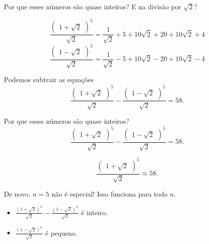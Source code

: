 \documentclass[aspectratio=169, handout]{beamer}
\begin{document}
\begin{frame}{Por que esses números são quase inteiros?}
	E na divisão por $\sqrt{2}$?

	\pause
	\[
		\frac{\begin{pmatrix}1+\sqrt{2}\end{pmatrix}^5}{\sqrt{2}} = \frac{1}{\sqrt{2}} + 5 + 10\sqrt{2} + 20 + 10\sqrt{2} + 4
	\]
	\[
		\frac{\begin{pmatrix}1-\sqrt{2}\end{pmatrix}^5}{\sqrt{2}} = \frac{1}{\sqrt{2}} - 5 + 10\sqrt{2} - 20 + 10\sqrt{2} - 4
	\]

	\pause Podemos subtrair as equações \[
		\frac{\begin{pmatrix} 1+\sqrt{2} \end{pmatrix}^5}{\sqrt{2}} - \frac{\begin{pmatrix} 1 - \sqrt{2} \end{pmatrix}^5}{\sqrt{2}} = 58.
	\]
\end{frame}

\begin{frame}{Por que esses números são quase inteiros?}
	\[
		\frac{\begin{pmatrix} 1+\sqrt{2} \end{pmatrix}^5}{\sqrt{2}} - \frac{\begin{pmatrix} 1 - \sqrt{2} \end{pmatrix}^5}{\sqrt{2}} = 58.
	\]

	\pause \[
		\frac{\begin{pmatrix} 1+\sqrt{2} \end{pmatrix}^5}{\sqrt{2}} \approx 58.
	\]


	\pause De novo, $n = 5$ não é especial! Isso funciona para todo $n$.

	\begin{itemize}
		\item $\frac{(1+\sqrt{2})^n}{\sqrt{2}} - \frac{(1-\sqrt{2})^n}{\sqrt{2}}$ é inteiro.
		\item $\frac{(1-\sqrt{2})^n}{\sqrt{2}}$ é pequeno.
	\end{itemize}
\end{frame}
\end{document}
